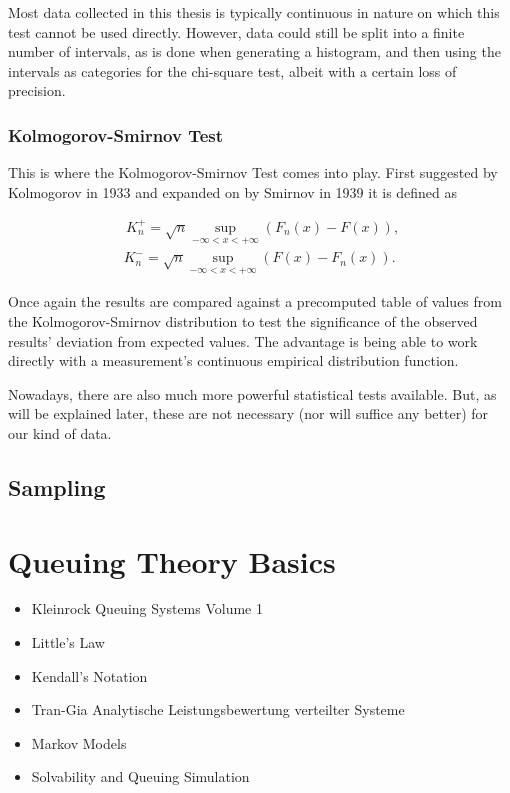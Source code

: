 Most data collected in this thesis is typically continuous in nature on which this test cannot be used directly. However, data could still be split into a finite number of intervals, as is done when generating a histogram, and then using the intervals as categories for the chi-square test, albeit with a certain loss of precision.

\subsubsection{Kolmogorov-Smirnov Test}

This is where the Kolmogorov-Smirnov Test comes into play. First suggested by Kolmogorov in 1933 \cite{kolmogorov1933sulla} and expanded on by Smirnov in 1939 \cite{smirnov1939estimation} it is defined as

\begin{equation}
	\begin{aligned}
	\phantom{,}K_n^+ = \sqrt{n} \sup_{-\infty < x < + \infty} \left( F_n(x) - F(x) \right), \\
	\phantom{.}K_n^- = \sqrt{n} \sup_{-\infty < x < + \infty} \left( F(x) - F_n(x) \right).
	\end{aligned}
\end{equation}

Once again the results are compared against a precomputed table of values from the Kolmogorov-Smirnov distribution to test the significance of the observed results' deviation from expected values. The advantage is being able to work directly with a measurement's continuous empirical distribution function.

Nowadays, there are also much more powerful statistical tests available. But, as will be explained later, these are not necessary (nor will suffice any better) for our kind of data.


\subsection{Sampling}


\section{Queuing Theory Basics}

\begin{itemize}
\item Kleinrock Queuing Systems Volume 1 \cite{Kleinrock:1975:TVQ:1096491}
\item Little's Law
\item Kendall's Notation
\item Tran-Gia Analytische Leistungsbewertung verteilter Systeme \cite{trangia-lbvs}
\item Markov Models 
\item Solvability and Queuing Simulation

\end{itemize}



